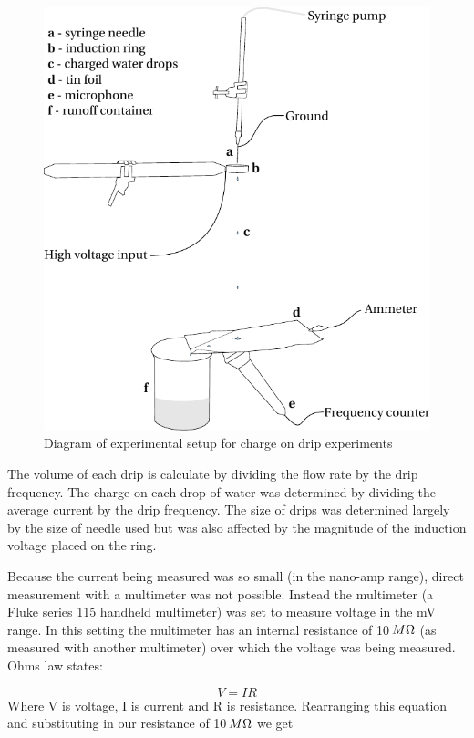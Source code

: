 \begin{figure}
    \centering
    \includegraphics[scale=0.9]{content/appendices/chargedWaterDrops/graphics/ChargedDrips_Figure_Drawing_ExperimentalSetup}
    \caption{\label{ChargedDrips_Figure_Drawing_ExperimentalSetup}Diagram of experimental
    setup for charge on drip experiments}
\end{figure}


The volume of each drip is calculate by dividing the flow rate by
the drip frequency. The charge on each drop of water was determined
by dividing the average current by the drip frequency. The size of
drips was determined largely by the size of needle used but was also
affected by the magnitude of the induction voltage placed on the ring.

Because the current being measured was so small (in the nano-amp range),
direct measurement with a multimeter was not possible. Instead the
multimeter (a Fluke series 115 handheld multimeter) was set to measure
voltage in the mV range. In this setting the multimeter has an internal
resistance of 10$\thinspace M\Omega$ (as measured with another multimeter)
over which the voltage was being measured. Ohms law states:

\begin{equation}
V=IR
\end{equation}
Where V is voltage, I is current and R is resistance. Rearranging
this equation and substituting in our resistance of 10$\thinspace M\Omega$
we get

